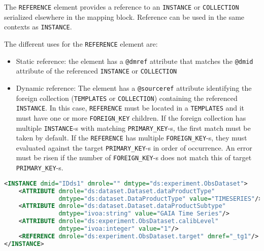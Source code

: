 The \texttt{REFERENCE} element provides a reference to an \texttt{INSTANCE} or \texttt{COLLECTION} serialized 
elsewhere in the mapping block.
Reference can be used in the same contexts as \texttt{INSTANCE}.

The different uses for the \texttt{REFERENCE} element are:

\begin{itemize}
    \item Static reference: the element has a \texttt{@dmref} attribute that matches the \texttt{@dmid} 
          attribute of the referenced \texttt{INSTANCE} or \texttt{COLLECTION} 
    \item Dynamic reference: The element has a \texttt{@sourceref} attribute identifying the foreign 
          collection (\texttt{TEMPLATES} or \texttt{COLLECTION}) containing the referenced \texttt{INSTANCE}.
          In this case, \texttt{REFERENCE} must be located in a \texttt{TEMPLATES} and it must have one 
          or more \texttt{FOREIGN\_KEY} children. 
          If the foreign collection has multiple \texttt{INSTANCE}-s with matching \texttt{PRIMARY\_KEY}-s, 
          the first match must be taken by default.
          If the \texttt{REFERENCE} has multiple \texttt{FOREIGN\_KEY}-s, they must evaluated 
          against the target \texttt{PRIMARY\_KEY}-s in order of occurrence.
          An error must be risen if the number of \texttt{FOREIGN\_KEY}-s does not match this of target 
          \texttt{PRIMARY\_KEY}-s.
\end{itemize}

\begin{lstlisting}[caption={Simple \texttt{REFERENCE}, to be replaced with the \texttt{INSTANCE} having \texttt{@dmid=\_tg1} (see line~\ref{REFERENCE_snippet_1} in Appendix~\ref{appendix_A}).},language=XML]
<INSTANCE dmid="IDds1" dmrole="" dmtype="ds:experiment.ObsDataset">
    <ATTRIBUTE dmrole="ds:dataset.Dataset.dataProductType" 
               dmtype="ds:dataset.DataProductType" value="TIMESERIES"/>
    <ATTRIBUTE dmrole="ds:dataset.Dataset.dataProductSubtype" 
               dmtype="ivoa:string" value="GAIA Time Series"/>
    <ATTRIBUTE dmrole="ds:experiment.ObsDataset.calibLevel" 
               dmtype="ivoa:integer" value="1"/>
    <REFERENCE dmrole="ds:experiment.ObsDataset.target" dmref="_tg1"/>
</INSTANCE>

\end{lstlisting}

